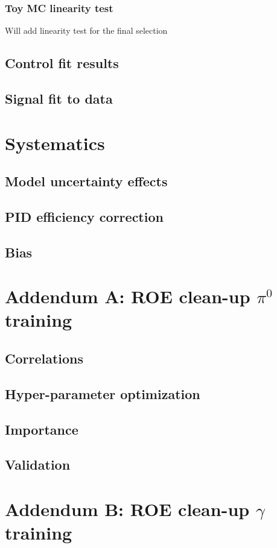\documentclass[oneside,a4paper,openany,12pt]{scrbook}
\begin{document}
\subsection{Toy MC linearity test}

Will add linearity test for the final selection

\section{Control fit results}
\section{Signal fit to data}

\chapter{Systematics}
\section{Model uncertainty effects}
\section{PID efficiency correction}
\section{Bias}

\chapter*{Addendum A: ROE clean-up $\pi^0$ training}
\section*{Correlations}
\section*{Hyper-parameter optimization}
\section*{Importance}
\section*{Validation}

\chapter*{Addendum B: ROE clean-up $\gamma$ training}
\end{document}
